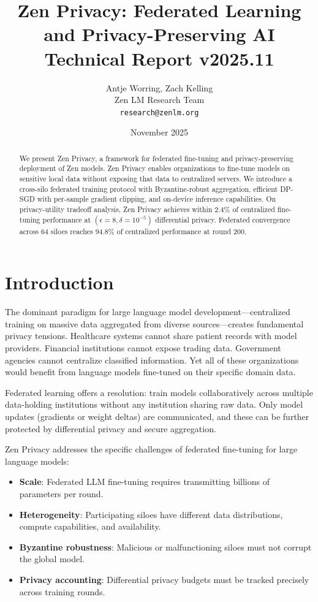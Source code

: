 \documentclass[11pt,a4paper]{article}
\title{\textbf{Zen Privacy: Federated Learning and Privacy-Preserving AI}\\
\large Technical Report v2025.11}
\author{Antje Worring, Zach Kelling \\ Zen LM Research Team\\
\texttt{research@zenlm.org}}
\date{November 2025}
\begin{document}
\maketitle

\begin{abstract}
We present Zen Privacy, a framework for federated fine-tuning and privacy-preserving deployment of Zen models. Zen Privacy enables organizations to fine-tune models on sensitive local data without exposing that data to centralized servers. We introduce a cross-silo federated training protocol with Byzantine-robust aggregation, efficient DP-SGD with per-sample gradient clipping, and on-device inference capabilities. On privacy-utility tradeoff analysis, Zen Privacy achieves within 2.4\% of centralized fine-tuning performance at $(\epsilon=8, \delta=10^{-5})$ differential privacy. Federated convergence across 64 siloes reaches 94.8\% of centralized performance at round 200.
\end{abstract}

\section{Introduction}

The dominant paradigm for large language model development—centralized training on massive data aggregated from diverse sources—creates fundamental privacy tensions. Healthcare systems cannot share patient records with model providers. Financial institutions cannot expose trading data. Government agencies cannot centralize classified information. Yet all of these organizations would benefit from language models fine-tuned on their specific domain data.

Federated learning offers a resolution: train models collaboratively across multiple data-holding institutions without any institution sharing raw data. Only model updates (gradients or weight deltas) are communicated, and these can be further protected by differential privacy and secure aggregation.

Zen Privacy addresses the specific challenges of federated fine-tuning for large language models:

\begin{itemize}
  \item \textbf{Scale}: Federated LLM fine-tuning requires transmitting billions of parameters per round.
  \item \textbf{Heterogeneity}: Participating siloes have different data distributions, compute capabilities, and availability.
  \item \textbf{Byzantine robustness}: Malicious or malfunctioning siloes must not corrupt the global model.
  \item \textbf{Privacy accounting}: Differential privacy budgets must be tracked precisely across training rounds.
\end{itemize}
\end{document}

